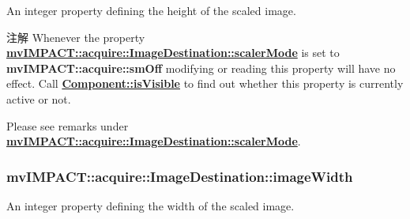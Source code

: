 An integer property defining the height of the scaled image. 

\begin{DoxyNote}{注解}
Whenever the property {\bfseries \hyperlink{classmv_i_m_p_a_c_t_1_1acquire_1_1_image_destination_a0e85ee4b320d7b84f664d00d02965c73}{mv\+I\+M\+P\+A\+C\+T\+::acquire\+::\+Image\+Destination\+::scaler\+Mode}} is set to {\bfseries mv\+I\+M\+P\+A\+C\+T\+::acquire\+::sm\+Off} modifying or reading this property will have no effect. Call {\bfseries \hyperlink{classmv_i_m_p_a_c_t_1_1acquire_1_1_component_ae9f95ac45440af06f7d36990ad633a73}{Component\+::is\+Visible}} to find out whether this property is currently active or not.

Please see remarks under {\bfseries \hyperlink{classmv_i_m_p_a_c_t_1_1acquire_1_1_image_destination_a0e85ee4b320d7b84f664d00d02965c73}{mv\+I\+M\+P\+A\+C\+T\+::acquire\+::\+Image\+Destination\+::scaler\+Mode}}. 
\end{DoxyNote}
\hypertarget{classmv_i_m_p_a_c_t_1_1acquire_1_1_image_destination_a4bbc153c68625e5e4a662d2334044df2}{
\subsubsection[{image\+Width}]{ mv\+I\+M\+P\+A\+C\+T\+::acquire\+::\+Image\+Destination\+::image\+Width}}\label{classmv_i_m_p_a_c_t_1_1acquire_1_1_image_destination_a4bbc153c68625e5e4a662d2334044df2}


An integer property defining the width of the scaled image. 

